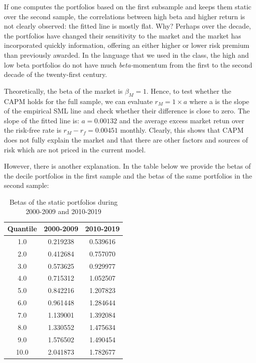 \documentclass[10pt]{article}
\begin{document}
\begin{exercies}{2}
  If one computes the portfolios based on the first subsample and keeps them
  static over the second sample, the correlations between high beta and higher
  return is not clearly observed: the fitted line is mostly flat. Why? Perhaps
  over the decade, the portfolios have changed their sensitivity to the market
  and the market has incorporated quickly information, offering an either higher
  or lower risk premium than previously awarded. In the language that we used in
  the class, the high and low beta portfolios do not have much
  \textit{beta-}momentum from the first to the second decade of the twenty-first
  century.

  Theoretically, the beta of the market is $\beta_M = 1$. Hence, to test whether
  the CAPM holds for the full sample, we can evaluate $r_M = 1 \times a$ where a
  is the slope of the empirical SML line and check whether their difference is
  close to zero. The slope of the fitted line is: $a=0.00132$ and the average
  excess market retun over the risk-free rate is $r_M - r_f = 0.00451$ monthly. Clearly,
  this shows that CAPM does not fully explain the market and that there are
  other factors and sources of risk which are not priced in the current model.

  However, there is another explanation. In the table below we provide the betas
  of the decile portfolios in the first sample and the betas of the same
  portfolios in the second sample:
  \begin{table}[H]
    \centering
    \begin{tabular}{| c | c | c |}
      \hline\hline
      Quantile & 2000-2009 & 2010-2019 \\ \hline \hline
1.0       &       0.219238    &     0.539616 \\ \hline
2.0        &      0.412684    &     0.757070 \\ \hline
3.0         &     0.573625    &     0.929977 \\ \hline
4.0         &     0.715312    &     1.052507 \\ \hline
5.0         &     0.842216    &     1.207823 \\ \hline
6.0         &     0.961448    &     1.284644 \\ \hline
7.0         &     1.139001    &     1.392084 \\ \hline
8.0         &     1.330552    &     1.475634 \\ \hline
9.0         &     1.576502    &     1.490454 \\ \hline
10.0         &     2.041873    &     1.782677 \\ \hline
    \end{tabular}
    \caption{Betas of the static portfolios during 2000-2009 and 2010-2019}
  \end{table}



\end{exercies}
\end{document}

